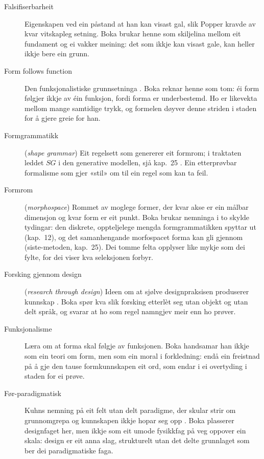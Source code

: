 \begin{description}
\item[Falsifiserbarheit] Eigenskapen ved ein påstand at han kan visast gal, slik Popper kravde av kvar vitskapleg setning. Boka brukar henne som skiljelina mellom eit fundament og ei vakker meining: det som ikkje kan visast gale, kan heller ikkje bere ein grunn.

\item[Form follows function] Den funksjonalistiske grunnsetninga \autocite{sullivan1896tall}. Boka reknar henne som tom: éi form følgjer ikkje av éin funksjon, fordi forma er underbestemd. Ho er likevekta mellom mange samtidige trykk, og formelen døyver denne striden i staden for å gjere greie for han.

\item[Formgrammatikk] (\textit{shape grammar}) Eit regelsett som genererer eit formrom; i traktaten leddet \(SG\) i den generative modellen, sjå kap.~25 \autocite{stiny1972}. Ein etterprøvbar formalisme som gjer «stil» om til ein regel som kan ta feil.

\item[Formrom] (\textit{morphospace}) Rommet av moglege former, der kvar akse er ein målbar dimensjon og kvar form er eit punkt. Boka brukar nemninga i to skylde tydingar: den diskrete, oppteljelege mengda formgrammatikken spyttar ut (kap.~12), og det samanhengande morfospacet forma kan gli gjennom (siste-metoden, kap.~25). Dei tomme felta opplyser like mykje som dei fylte, for dei viser kva seleksjonen forbyr.

\item[Forsking gjennom design] (\textit{research through design}) Ideen om at sjølve designpraksisen produserer kunnskap \autocite{frayling1993,gaver2012what}. Boka spør kva slik forsking etterlèt seg utan objekt og utan delt språk, og svarar at ho som regel namngjev meir enn ho prøver.

\item[Funksjonalisme] Læra om at forma skal følgje av funksjonen. Boka handsamar han ikkje som ein teori om form, men som ein moral i forkledning: endå ein freistnad på å gje den tause formkunnskapen eit ord, som endar i ei overtyding i staden for ei prøve.

\item[Før-paradigmatisk] Kuhns nemning på eit felt utan delt paradigme, der skular strir om grunnomgrepa og kunnskapen ikkje hopar seg opp \autocite{kuhn1962}. Boka plasserer designfaget her, men ikkje som eit umode fysikkfag på veg oppover ein skala: design er eit anna slag, strukturelt utan det delte grunnlaget som ber dei paradigmatiske faga.


\end{description}
